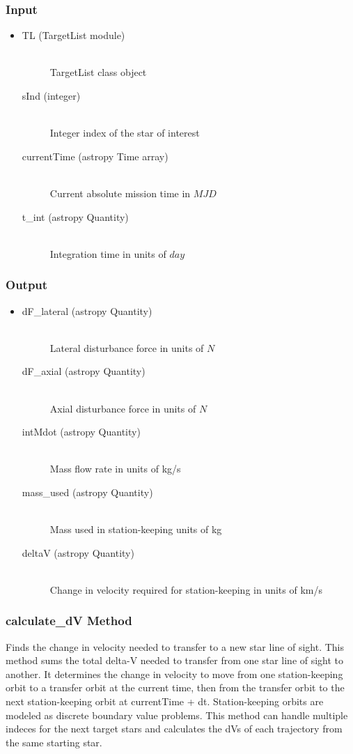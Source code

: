 \documentclass[cleanfoot]{asme2ej}
\begin{document}
\subsubsection*{Input}
\begin{itemize}
\item
\begin{description}
    \item[TL (TargetList module)] \hfill \\ TargetList class object
    \item[sInd (integer)] \hfill \\ Integer index of the star of interest
    \item[currentTime (astropy Time array)] \hfill \\ Current absolute mission time in $MJD$
    \item[t\_int (astropy Quantity)] \hfill \\ Integration time in units of $day$
\end{description}
\end{itemize}
\subsubsection*{Output}
\begin{itemize}
\item
\begin{description}
    \item[dF\_lateral (astropy Quantity)] \hfill \\ Lateral disturbance force in units of $N$
    \item[dF\_axial (astropy Quantity)] \hfill \\ Axial disturbance force in units of $N$
    \item[intMdot (astropy Quantity)] \hfill \\ Mass flow rate in units of kg/s
    \item[mass\_used (astropy Quantity)] \hfill \\ Mass used in station-keeping units of kg
    \item[deltaV (astropy Quantity)] \hfill \\ Change in velocity required for station-keeping in units of km/s
\end{description}
\end{itemize}

\subsubsection{calculate\_dV Method} 
Finds the change in velocity needed to transfer to a new star line of sight. This method sums the total delta-V needed to transfer from one star line of sight to another. It determines the change in velocity to move from one station-keeping orbit to a transfer orbit at the current time, then from the transfer orbit to the next station-keeping orbit at currentTime + dt. Station-keeping orbits are modeled as discrete boundary value problems. This method can handle multiple indeces for the next target stars and calculates the dVs of each trajectory from the same starting star.
\end{document}
